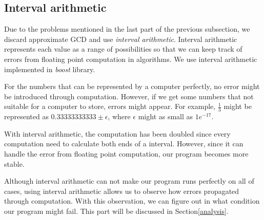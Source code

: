 \subsection{Interval arithmetic}

Due to the problems mentioned in the last part of the previous subsection, we discard
approximate GCD and use \textit{interval arithmetic}. Interval arithmetic represents each
value as a range of possibilities so that we can keep track of errors from floating
point computation in algorithms. We use interval arithmetic implemented in
\textit{boost} library.

For the numbers that can be represented by a computer perfectly, no error might be
introduced through computation. However, if we get some numbers that not
suitable for a computer to store, errors might appear. For example, $\frac{1}{3}$
might be represented as $0.33333333333 \pm \epsilon$, where $\epsilon$ might as small
as $1e^{-17}$.



With interval arithmetic, the computation has been doubled since every
computation need to calculate both ends of a interval. However, since it can
handle the error from floating point computation, our program becomes more stable.

Although interval arithmetic can not make our program runs perfectly on all of
cases, using interval arithmetic allows us to observe how errors propagated
through computation. With this observation, we can figure out in what
condition our program might fail. This part will be discussed in
Section\ref{analysis}.

